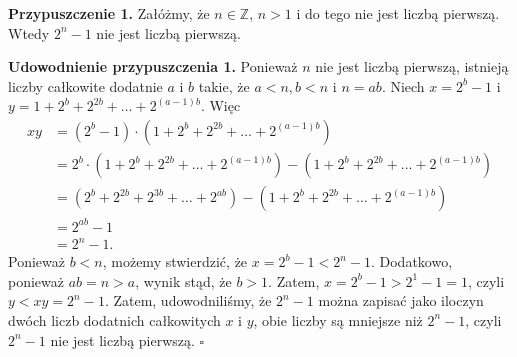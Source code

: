 \documentclass[12pt, a4paper]{article}
\begin{document}
\textbf{Przypuszczenie 1.} Załóżmy, że $n \in \mathbb{Z}$, $n > 1$ i do tego nie jest liczbą pierwszą.
Wtedy $2^n - 1$ nie jest liczbą pierwszą.
\vspace{1em}

\noindent \textbf{Udowodnienie przypuszczenia 1.} Ponieważ $n$ nie jest liczbą pierwszą, istnieją liczby całkowite
dodatnie $a$ i $b$ takie, że $a < n, b < n$ i $n = ab$. Niech $x = 2^b - 1$ i $y = 1 + 2^b + 2^{2b} + \dots + 2^{\left(a-1\right)b}$.
Więc
\begin{align*}
  xy &= \left(2^b -1\right) \cdot \left(1 + 2^b + 2^{2b} + \dots + 2^{\left(a - 1\right)b}\right) \\
     &= 2^b \cdot \left(1 + 2^b + 2^{2b} + \dots + 2^{\left(a-1\right)b}\right) - \left(1 + 2^b + 2^{2b} + \dots + 2^{\left(a-1\right)b}\right) \\
     &= \left(2^b + 2^{2b} + 2^{3b} + \dots + 2^{ab}\right) - \left(1 + 2^b + 2^{2b} + \dots + 2^{\left(a - 1\right)b}\right) \\
     &= 2^{ab} - 1 \\
     &= 2^n - 1.
\end{align*}
Ponieważ $b < n$, możemy stwierdzić, że $x = 2^b - 1 < 2^n - 1$. Dodatkowo, ponieważ $ab = n > a$, wynik stąd, że $b > 1$.
Zatem, $x = 2^b - 1 > 2^1 -1 = 1$, czyli $y < xy = 2^n - 1$. Zatem, udowodniliśmy, że $2^n - 1$ można zapisać jako iloczyn
dwóch liczb dodatnich całkowitych $x$ i $y$, obie liczby są mniejsze niż $2^n - 1$, czyli $2^n - 1$ nie jest liczbą pierwszą. \hfill $\square$
\end{document}
